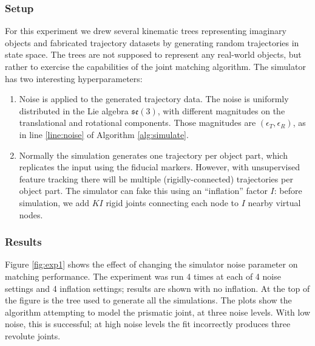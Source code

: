 \documentclass[letterpaper, 10 pt, conference]{ieeeconf}  %
\begin{document}
\subsubsection{Setup}
For this experiment we drew several kinematic trees representing imaginary objects and fabricated trajectory datasets by generating random trajectories in state space. The trees are not supposed to represent any real-world objects, but rather to exercise the capabilities of the joint matching algorithm. The simulator has two interesting hyperparameters:
\begin{enumerate}
  \item Noise is applied to the generated trajectory data. The noise is uniformly distributed in the Lie algebra $\mathfrak{se}(3)$, with different magnitudes on the translational and rotational components. Those magnitudes are $(\epsilon_T, \epsilon_R)$, as in line \ref{line:noise} of Algorithm \ref{alg:simulate}.
  \item Normally the simulation generates one trajectory per object part, which replicates the input using the fiducial markers. However, with unsupervised feature tracking there will be multiple (rigidly-connected) trajectories per object part. The simulator can fake this using an ``inflation'' factor $I$: before simulation, we add $KI$ rigid joints connecting each node to $I$ nearby virtual nodes.
\end{enumerate}

\subsubsection{Results}
Figure \ref{fig:exp1} shows the effect of changing the simulator noise parameter on matching performance. The experiment was run 4 times at each of 4 noise settings and 4 inflation settings; results are shown with no inflation. At the top of the figure is the tree used to generate all the simulations. The plots show the algorithm attempting to model the prismatic joint, at three noise levels. With low noise, this is successful; at high noise levels the fit incorrectly produces three revolute joints.
\end{document}
